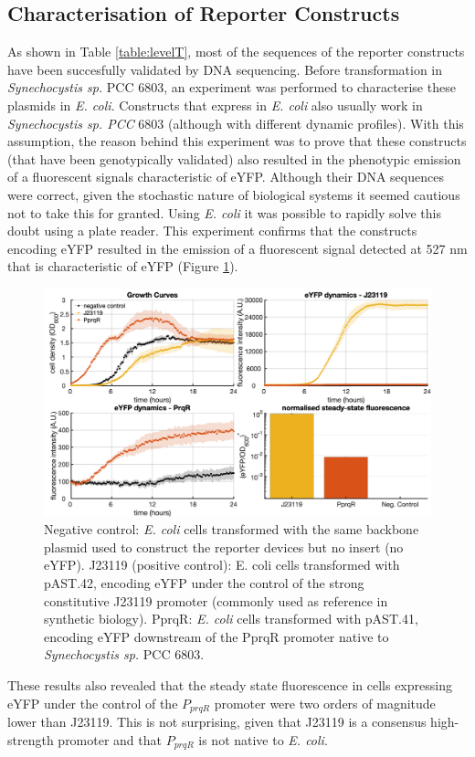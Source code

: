 \subsection{Characterisation of Reporter Constructs}
\label{sec:charactreporter}
As shown in Table \ref{table:levelT}, most of the sequences of the reporter constructs have been succesfully validated by DNA sequencing. Before transformation in \textit{Synechocystis sp.} PCC 6803, an experiment was performed to characterise these plasmids in \textit{E. coli}. Constructs that express in \textit{E. coli} also usually work in \textit{Synechocystis sp. PCC} 6803 (although with different dynamic profiles). With this assumption, the reason behind this experiment was to prove that these constructs (that have been genotypically validated) also resulted in the phenotypic emission of a fluorescent signals characteristic of eYFP. Although their DNA sequences were correct, given the stochastic nature of biological systems it seemed cautious not to take this for granted. Using \textit{E. coli} it was possible to rapidly solve this doubt using a plate reader.  This experiment confirms that the constructs encoding eYFP resulted in the emission of a fluorescent signal detected at 527 nm that is characteristic of eYFP (Figure \ref{fig:platereader}). 

\begin{figure}[H]
    \centering
    \includegraphics[width=\hsize]{figs/eYFP_J23119vsPprqR_ecoli_12_2020.png}
    \caption{Negative control: \textit{E. coli} cells transformed with the same backbone plasmid used to construct the reporter devices but no insert (no eYFP). J23119 (positive control): {E. coli} cells transformed with pAST.42, encoding eYFP under the control of the strong constitutive J23119 promoter (commonly used as reference in synthetic biology). PprqR: \textit{E. coli} cells transformed with pAST.41, encoding eYFP downstream of the PprqR promoter native to \textit{Synechocystis sp.} PCC 6803.}
    \label{fig:platereader}
\end{figure}
These results also revealed that the steady state fluorescence in cells expressing eYFP under the control of the $P_{prqR}$ promoter were two orders of magnitude lower than J23119. This is not surprising, given that  J23119 is a consensus high-strength promoter and that $P_{prqR}$ is not native to \textit{E. coli}. 


